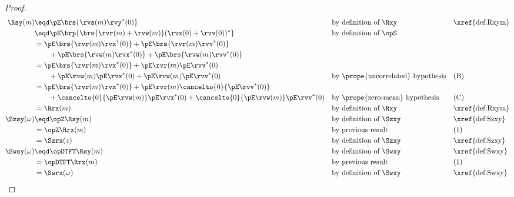 \begin{proof}
\begin{align*}
  \Rsy(m) 
    &\eqd \pE\brs{\rvs(m)\rvy^\ast(0)}
    && \text{by definition of $\Rxy$}
    && \text{\xref{def:Rxym}}
  \\&\eqd \pE\brp{\brs{\rvr(m)+\rvw(m)}(\rvx(0)+\rvv(0))^\ast}
    && \text{by definition of $\opS$}
  \\&= \pE\brs{\rvr(m)\rvx^\ast(0)}  
      +\pE\brs{\rvr(m)\rvv^\ast(0)}  
      \\&\qquad
      +\pE\brs{\rvw(m)\rvx^\ast(0)}  
      +\pE\brs{\rvw(m)\rvv^\ast(0)}  
  \\&= \pE\brs{\rvr(m)\rvx^\ast(0)}  
      +\pE\rvr(m)\pE\rvv^\ast(0)  
      \\&\qquad
      +\pE\rvw(m)\pE\rvx^\ast(0)  
      +\pE\rvw(m)\pE\rvv^\ast(0)  
    && \text{by \prope{uncorrelated} hypothesis}
    && \text{(B)}
  \\&= \pE\brs{\rvr(m)\rvx^\ast(0)}  
      +\pE\rvr(m)\cancelto{0}{\pE\rvv^\ast(0)}
      \\&\qquad
      +\cancelto{0}{\pE\rvw(m)}\pE\rvx^\ast(0)  
      +\cancelto{0}{\pE\rvw(m)}\pE\rvv^\ast(0)  
    && \text{by \prope{zero-mean} hypothesis}
    && \text{(C)}
  \\&= \Rrx(m)
    && \text{by definition of $\Rxy$}
    && \text{\xref{def:Rxym}}
  \\
  \Szsy(\omega)
    &\eqd \opZ\Rsy(m)
    && \text{by definition of $\Szxy$}
    && \text{\xref{def:Szxy}}
  \\&= \opZ\Rrx(m)
    && \text{by previous result}
    && \text{(1)}
  \\&= \Szrx(z)
    && \text{by definition of $\Szxy$}
    && \text{\xref{def:Szxy}}
  \\
  \Swsy(\omega)
    &\eqd \opDTFT\Rsy(m)
    && \text{by definition of $\Swxy$}
    && \text{\xref{def:Swxy}}
  \\&= \opDTFT\Rrx(m)
    && \text{by previous result}
    && \text{(1)}
  \\&= \Swrx(\omega)
    && \text{by definition of $\Swxy$}
    && \text{\xref{def:Swxy}}
\end{align*}
\end{proof}

